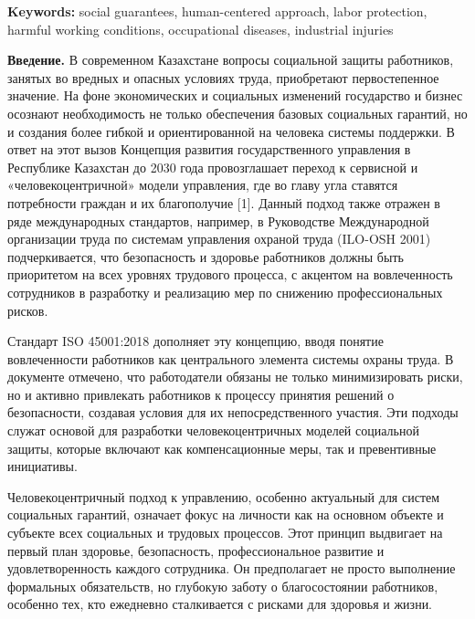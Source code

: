 {\bfseries Keywords:} social guarantees, human-centered approach, labor
protection, harmful working conditions, occupational diseases,
industrial injuries
\begin{multicols}{2}

{\bfseries Введение.} В современном Казахстане вопросы социальной защиты
работников, занятых во вредных и опасных условиях труда, приобретают
первостепенное значение. На фоне экономических и социальных изменений
государство и бизнес осознают необходимость не только обеспечения
базовых социальных гарантий, но и создания более гибкой и
ориентированной на человека системы поддержки. В ответ на этот вызов
Концепция развития государственного управления в Республике Казахстан до
2030 года провозглашает переход к сервисной и «человекоцентричной»
модели управления, где во главу угла ставятся потребности граждан и их
благополучие {[}1{]}. Данный подход также отражен в ряде международных
стандартов, например, в Руководстве Международной организации труда по
системам управления охраной труда (ILO-OSH 2001) подчеркивается, что
безопасность и здоровье работников должны быть приоритетом на всех
уровнях трудового процесса, с акцентом на вовлеченность сотрудников в
разработку и реализацию мер по снижению профессиональных
рисков\hspace{0pt}.

Стандарт ISO 45001:2018 дополняет эту концепцию, вводя понятие
вовлеченности работников как центрального элемента системы охраны труда.
В документе отмечено, что работодатели обязаны не только минимизировать
риски, но и активно привлекать работников к процессу принятия решений о
безопасности, создавая условия для их непосредственного
участия\hspace{0pt}. Эти подходы служат основой для разработки
человекоцентричных моделей социальной защиты, которые включают как
компенсационные меры, так и превентивные инициативы.

Человекоцентричный подход к управлению, особенно актуальный для систем
социальных гарантий, означает фокус на личности как на основном объекте
и субъекте всех социальных и трудовых процессов. Этот принцип выдвигает
на первый план здоровье, безопасность, профессиональное развитие и
удовлетворенность каждого сотрудника. Он предполагает не просто
выполнение формальных обязательств, но глубокую заботу о благосостоянии
работников, особенно тех, кто ежедневно сталкивается с рисками для
здоровья и жизни.


\end{multicols}
